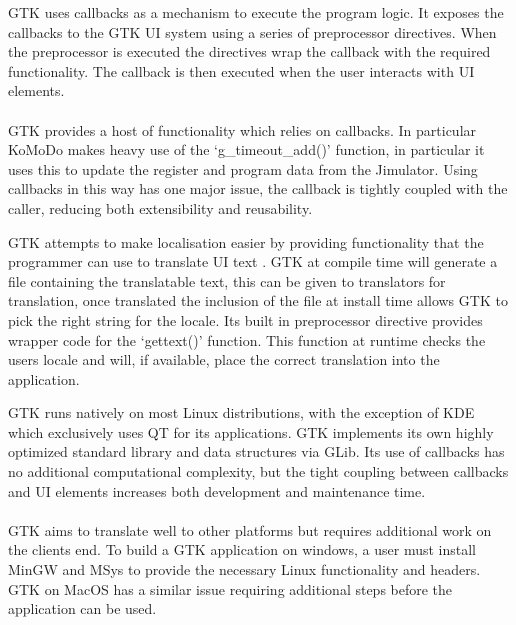   GTK uses callbacks as a mechanism to execute the program logic. It exposes the callbacks to the GTK UI system using a series of preprocessor directives. When the preprocessor is executed the directives wrap the callback with the required functionality. The callback is then executed when the user interacts with UI elements.\\\\
  GTK provides a host of functionality which relies on callbacks. In particular KoMoDo makes heavy use of the `g\_timeout\_add()' function, in particular it uses this to update the register and program data from the Jimulator. Using callbacks in this way has one major issue, the callback is tightly coupled with the caller, reducing both extensibility and reusability.

  GTK attempts to make localisation easier by providing functionality that the programmer can use to translate UI text \cite{gtk_localisation}. GTK at compile time will generate a file containing the translatable text, this can be given to translators for translation, once translated the inclusion of the file at install time allows GTK to pick the right string for the locale. Its built in preprocessor directive provides wrapper code for the `gettext()' function. This function at runtime checks the users locale and will, if available, place the correct translation into the application.

  GTK runs natively on most Linux distributions, with the exception of KDE which exclusively uses QT for its applications. GTK implements its own highly optimized standard library and data structures via GLib\cite{glib}. Its use of callbacks has no additional computational complexity, but the tight coupling between callbacks and UI elements increases both development and maintenance time.\\\\
  GTK aims to translate well to other platforms but requires additional work on the clients end. To build a GTK application on windows, a user must install MinGW and MSys to provide the necessary Linux functionality and headers. GTK on MacOS has a similar issue requiring additional steps before the application can be used.

